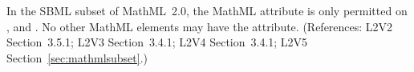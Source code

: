 In the SBML subset of MathML~2.0, the MathML attribute
 is only permitted on ,
 and .  No other
MathML elements may have the  attribute.
(References: L2V2 Section~3.5.1; L2V3 Section~3.4.1; L2V4 Section~3.4.1; 
L2V5 Section~\ref{sec:mathmlsubset}.)
